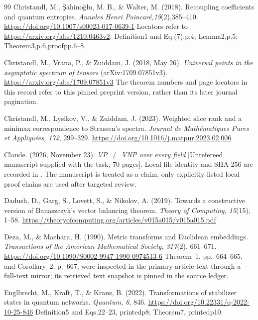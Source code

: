 \begin{thebibliography}{99}
Christandl, M., \c{S}ahino\u{g}lu, M. B., \& Walter, M. (2018).
Recoupling coefficients and quantum entropies.
\emph{Annales Henri Poincar\'e,19}(2),385--410.
\url{https://doi.org/10.1007/s00023-017-0639-1}
Locators refer to \url{https://arxiv.org/abs/1210.0463v2}:
Definition1 and Eq.(7),p.4; Lemma2,p.5; Theorem3,p.6,proofpp.6--8.

Christandl, M., Vrana, P., \& Zuiddam, J. (2018, May 26).
\emph{Universal points in the asymptotic spectrum of tensors}
(arXiv:1709.07851v3). \url{https://arxiv.org/abs/1709.07851v3}
The theorem numbers and page locators in this record refer to this
pinned preprint version, rather than its later journal pagination.

Christandl, M., Lysikov, V., \& Zuiddam, J. (2023).
Weighted slice rank and a minimax correspondence to Strassen's spectra.
\emph{Journal de Math\'ematiques Pures et Appliqu\'ees, 172},
299--329. \url{https://doi.org/10.1016/j.matpur.2023.02.006}

Claude. (2026, November 23). \emph{VP $\ne$ VNP over every field}
[Unrefereed manuscript supplied with the task; 70 pages].
Local file identity and SHA-256 are recorded in
. The manuscript is treated as a claim;
only explicitly listed local proof chains are used after targeted review.

Dadush, D., Garg, S., Lovett, S., \& Nikolov, A. (2019).
Towards a constructive version of Banaszczyk's vector balancing theorem.
\emph{Theory of Computing, 15}(15), 1--58.
\url{https://theoryofcomputing.org/articles/v015a015/v015a015.pdf}

Deza, M., \& Maehara, H. (1990). Metric transforms and Euclidean
embeddings. \emph{Transactions of the American Mathematical Society,
317}(2), 661--671.
\url{https://doi.org/10.1090/S0002-9947-1990-0974513-6}
Theorem~1, pp.~664--665, and Corollary~2, p.~667, were inspected
in the primary article text through a full-text mirror; its retrieved
text snapshot is pinned in the source ledger.

Englbrecht, M., Kraft, T., \& Kraus, B. (2022).
Transformations of stabilizer states in quantum networks.
\emph{Quantum, 6}, 846.
\url{https://doi.org/10.22331/q-2022-10-25-846}
Definition5 and Eqs.22--23, printedp8; Theorem7, printedp10.


\end{thebibliography}
